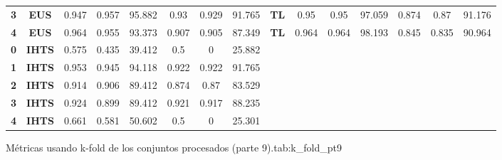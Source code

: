 {{\begin{tabular}{c|c|cccccc|ccccccc}
\textbf{3} & \textbf{EUS} & 0.947 & 0.957 & 95.882 & 0.93  & 0.929 & 91.765 & \multicolumn{1}{c|}{\textbf{TL}} & 0.95  & 0.95  & 97.059 & 0.874 & 0.87  & 91.176 \\
\textbf{4} & \textbf{EUS} & 0.964 & 0.955 & 93.373 & 0.907 & 0.905 & 87.349 & \multicolumn{1}{c|}{\textbf{TL}} & 0.964 & 0.964 & 98.193 & 0.845 & 0.835 & 90.964 \\
\textbf{0} & \textbf{IHTS} & 0.575 & 0.435 & 39.412 & 0.5   & 0     & 25.882 &       &       &       &       &       &       &  \\
\textbf{1} & \textbf{IHTS} & 0.953 & 0.945 & 94.118 & 0.922 & 0.922 & 91.765 &       &       &       &       &       &       &  \\
\textbf{2} & \textbf{IHTS} & 0.914 & 0.906 & 89.412 & 0.874 & 0.87  & 83.529 &       &       &       &       &       &       &  \\
\textbf{3} & \textbf{IHTS} & 0.924 & 0.899 & 89.412 & 0.921 & 0.917 & 88.235 &       &       &       &       &       &       &  \\
\textbf{4} & \textbf{IHTS} & 0.661 & 0.581 & 50.602 & 0.5   & 0     & 25.301 &       &       &       &       &       &       &  \\
\end{tabular}}}{Métricas usando k-fold de los conjuntos procesados (parte 9).}{tab:k_fold_pt9}


